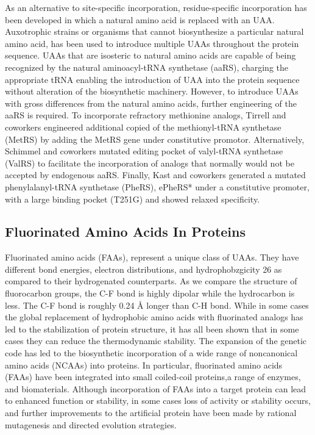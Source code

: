 \begin{refsection}
As an alternative to site-specific incorporation, residue-specific
incorporation has been developed in which a natural amino acid is replaced with
an UAA. Auxotrophic strains or organisms that cannot biosynthesize a particular
natural amino acid, has been used to introduce multiple UAAs throughout the
protein sequence. UAAs that are isosteric to natural amino acids are capable of
being recognized by the natural aminoacyl-tRNA synthetase (aaRS), charging the
appropriate tRNA enabling the introduction of UAA into the protein sequence
without alteration of the biosynthetic machinery. However, to introduce UAAs
with gross differences from the natural amino acids, further engineering of the
aaRS is required. To incorporate refractory methionine analogs, Tirrell and
coworkers engineered additional copied of the methionyl-tRNA synthetase (MetRS)
by adding the MetRS gene under constitutive promotor.\cite{Kiick2000}
Alternatively, Schimmel and coworkers mutated editing pocket of valyl-tRNA
synthetase (ValRS) to facilitate the incorporation of analogs that normally
would not be accepted by endogenous aaRS.\cite{Doring2001} Finally, Kast and
coworkers generated a mutated phenylalanyl-tRNA synthetase (PheRS), ePheRS*
under a constitutive promoter, with a large binding pocket (T251G) and showed
relaxed specificity.\cite{Kast1991}

\subsection{Fluorinated Amino Acids In Proteins} 
\label{sec:faa}

Fluorinated amino acids (FAAs), represent a unique class of UAAs. They have
different bond energies, electron distributions, and hydrophobzgicity 26 as
compared to their hydrogenated counterparts. As we compare the structure of
fluorocarbon groups, the C-F bond is highly dipolar while the hydrocarbon is
less. The C-F bond is roughly 0.24 {\AA} longer than C-H bond.\cite{Tang2001}
While in some cases the global replacement of hydrophobic amino acids with
fluorinated analogs has led to the stabilization of protein
structure\cite{Biffinger2004}, it has all been shown that in some cases they
can reduce the thermodynamic stability.\cite{Panchenko2006b} The expansion of
the genetic code has led to the biosynthetic incorporation of a wide range of
noncanonical amino acids (NCAAs) into proteins.\cite{Voloshchuk2010} In
particular, fluorinated amino acids (FAAs) have been integrated into small
coiled-coil proteins,\cite{Montclare2009b,Tang2001}a range of
enzymes,\cite{Voloshchuk2009,Panchenko2006b,Voloshchuk2007b,Mehta2011,Hammill2007}
and biomaterials.\cite{Yuvienco2012b} Although incorporation of FAAs into a
target protein can lead to enhanced function or stability, in some cases loss
of activity or stability occurs, and further improvements to the artificial
protein have been made by rational mutagenesis\cite{Voloshchuk2007b} and
directed evolution strategies.\cite{Montclare2006b}


\end{refsection}
